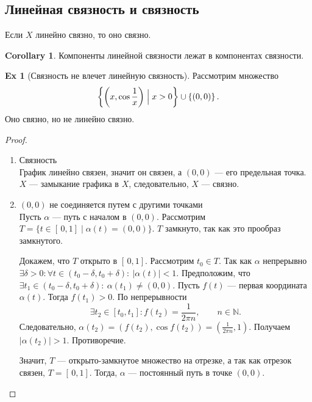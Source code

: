 \documentclass[11pt]{book}
\newcommand{\N}{\mathbb{N}}
\theoremstyle{definition}
\theoremstyle{plain}
\theoremstyle{plain}
\theoremstyle{definition}
\newtheorem*{ex}{Ex}
\newtheorem*{cor}{Corollary}
\theoremstyle{remark}
\begin{document}
\subsection{Линейная связность и связность}
\begin{thm}
    Если $ X$ линейно связно, то оно связно.
\end{thm}
\begin{cor}
    Компоненты линейной связности лежат  в компонентах связности.
\end{cor}
\begin{ex}[Связность не влечет линейную связность]
    Рассмотрим множество
    \[
	\left\{ \left(  x, \cos \frac{1}{x} \right) \Bigm| x>0 \right\} \cup \left\{ (0, 0) \right\}
    .\]
    Оно связно, но не линейно связно.
\end{ex}
\begin{proof}
    $ $
    \begin{enumerate}
	\item Связность \\
	    График линейно связен, значит он связен, а $ (0, 0)$ --- его предельная точка.  $ X$ --- замыкание графика в $ X$, следовательно,  $ X$ --- связно.
	\item $ (0, 0)$ не соединяется путем с другими точками \\
	    Пусть $ \alpha $ --- путь с началом в $ (0, 0)$.
	    Рассмотрим $ T = \{t \in [\,0, 1] \mid \alpha (t) = (0,0)\}$.
	    $ T$ замкнуто, так как это прообраз замкнутого.

	    Докажем, что  $ T$ открыто в  $[\,0, 1]$.
	    Рассмотрим $ t_0 \in  T$. Так как $ \alpha $ непрерывно $ \exists  \delta >0: \forall t \in  (t_0 - \delta , t_0 + \delta ) : ~ | \alpha (t) | <1$. Предположим, что $ \exists t_1 \in  (t_0 - \delta , t_0 + \delta ) : ~ \alpha (t_1) \ne (0, 0)$.
	    Пусть  $ f(t)$ --- первая координата  $ \alpha (t)$.
	    Тогда $ f(t_1) > 0$. По непрерывности
	    \[
		\exists t_2 \in  [t_0, t_1] : f(t_2) = \frac{1}{2 \pi n}, \qquad  n \in  \N
	    .\]
	    Следовательно, $ \alpha (t_2) = (f(t_2), \cos f(t_2)) = \left( \frac{1}{2 \pi n}, 1 \right) $. Получаем $ | \alpha (t_2)| > 1$. Противоречие.

	    Значит, $ T$ --- открыто-замкнутое множество на отрезке, а так как отрезок связен,  $ T = [\,0, 1]$. Тогда,  $ \alpha $ --- постоянный путь в точке $ (0, 0)$.
    \end{enumerate}
\end{proof}
\end{document}
